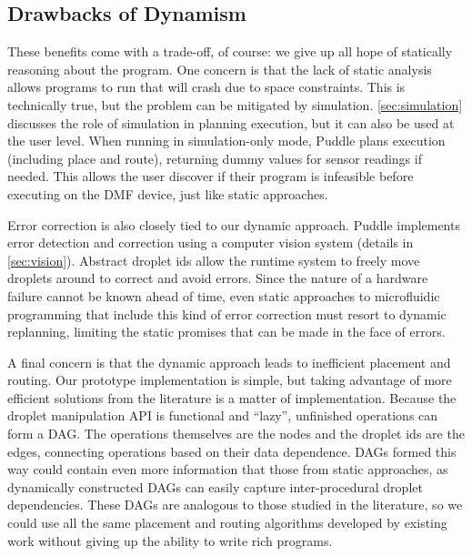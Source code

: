 \documentclass[sigconf, screen]{acmart}
\newcommand\karin[1]{\todo[color=green!80]{\sf #1}}
\begin{document}
\subsection{Drawbacks of Dynamism}
\label{sec:drawbacks}

These benefits come with a trade-off, of course: we give up all hope of statically reasoning about the program.
One concern is that the lack of static analysis allows programs to run that will crash due to space constraints.
This is technically true, but the problem can be mitigated by simulation.
\autoref{sec:simulation} discusses the role of simulation in planning execution, but it can also be used at the user level.
When running in simulation-only mode, Puddle plans execution (including place and route), returning dummy values for sensor readings if needed.
This allows the user discover if their program is infeasible before executing on the DMF device, just like static approaches.

Error correction is also closely tied to our dynamic approach.
Puddle implements error detection and correction using a computer vision system (details in \autoref{sec:vision}).
Abstract droplet ids allow the runtime system to freely move droplets around to correct and avoid errors.
Since the nature of a hardware failure cannot be known ahead of time, even static approaches to microfluidic programming that include this kind of error correction must resort to dynamic replanning, limiting the static promises that can be made in the face of errors.

A final concern is that the dynamic approach leads to inefficient placement and routing.
Our prototype implementation is simple, but taking advantage of more efficient solutions from the literature \cite{bohringer2006parallel, grissom2012scheduling, keszocze2015routing, roy2010routing}
is a matter of implementation.
Because the droplet manipulation API is functional and ``lazy'', unfinished operations can form a DAG.
The operations themselves are the nodes and the droplet ids are the edges, connecting operations based on their data dependence.
DAGs formed this way could contain even more information that those from static approaches, as dynamically constructed DAGs can easily capture inter-procedural droplet dependencies.
These DAGs are analogous to those studied in the literature, so
we could use all the same placement and routing algorithms developed by existing work without giving up the ability to write rich programs.
\end{document}
